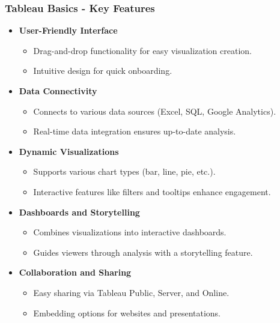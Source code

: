 \documentclass[aspectratio=169]{beamer}
\begin{document}
\begin{frame}[fragile]
    \frametitle{Tableau Basics - Key Features}
    \begin{itemize}
        \item \textbf{User-Friendly Interface}
            \begin{itemize}
                \item Drag-and-drop functionality for easy visualization creation.
                \item Intuitive design for quick onboarding.
            \end{itemize}
        \item \textbf{Data Connectivity}
            \begin{itemize}
                \item Connects to various data sources (Excel, SQL, Google Analytics).
                \item Real-time data integration ensures up-to-date analysis.
            \end{itemize}
        \item \textbf{Dynamic Visualizations}
            \begin{itemize}
                \item Supports various chart types (bar, line, pie, etc.).
                \item Interactive features like filters and tooltips enhance engagement.
            \end{itemize}
        \item \textbf{Dashboards and Storytelling}
            \begin{itemize}
                \item Combines visualizations into interactive dashboards.
                \item Guides viewers through analysis with a storytelling feature.
            \end{itemize}
        \item \textbf{Collaboration and Sharing}
            \begin{itemize}
                \item Easy sharing via Tableau Public, Server, and Online.
                \item Embedding options for websites and presentations.
            \end{itemize}
    \end{itemize}
\end{frame}
\end{document}
